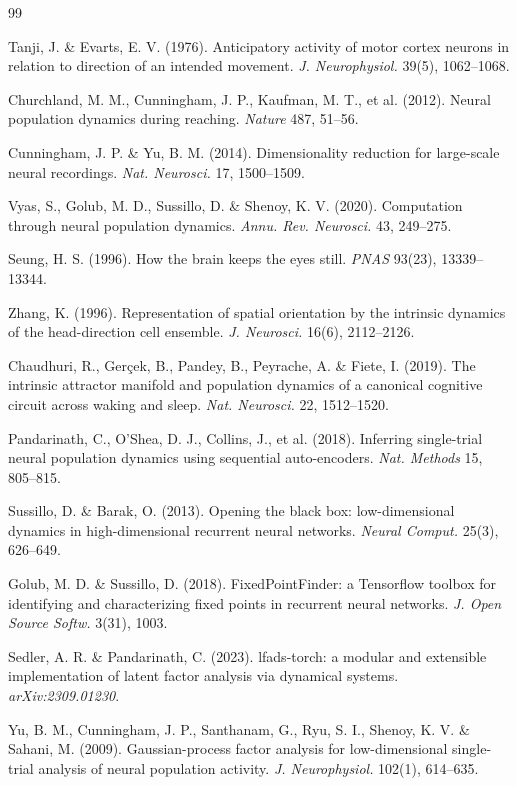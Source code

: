 \documentclass[11pt]{article}
\begin{document}
\begin{thebibliography}{99}

 Tanji, J. \& Evarts, E. V. (1976). Anticipatory activity of
motor cortex neurons in relation to direction of an intended movement.
\emph{J. Neurophysiol.} 39(5), 1062--1068.

 Churchland, M. M., Cunningham, J. P., Kaufman, M. T., et
al. (2012). Neural population dynamics during reaching. \emph{Nature} 487,
51--56.

 Cunningham, J. P. \& Yu, B. M. (2014). Dimensionality
reduction for large-scale neural recordings. \emph{Nat. Neurosci.} 17,
1500--1509.

 Vyas, S., Golub, M. D., Sussillo, D. \& Shenoy, K. V. (2020).
Computation through neural population dynamics. \emph{Annu. Rev. Neurosci.} 43,
249--275.

 Seung, H. S. (1996). How the brain keeps the eyes still.
\emph{PNAS} 93(23), 13339--13344.

 Zhang, K. (1996). Representation of spatial orientation by
the intrinsic dynamics of the head-direction cell ensemble.
\emph{J. Neurosci.} 16(6), 2112--2126.

 Chaudhuri, R., Ger\c{c}ek, B., Pandey, B., Peyrache, A.
\& Fiete, I. (2019). The intrinsic attractor manifold and population dynamics of
a canonical cognitive circuit across waking and sleep. \emph{Nat. Neurosci.} 22,
1512--1520.

 Pandarinath, C., O'Shea, D. J., Collins, J., et al.
(2018). Inferring single-trial neural population dynamics using sequential
auto-encoders. \emph{Nat. Methods} 15, 805--815.

 Sussillo, D. \& Barak, O. (2013). Opening the black box:
low-dimensional dynamics in high-dimensional recurrent neural networks.
\emph{Neural Comput.} 25(3), 626--649.

 Golub, M. D. \& Sussillo, D. (2018). FixedPointFinder: a
Tensorflow toolbox for identifying and characterizing fixed points in recurrent
neural networks. \emph{J. Open Source Softw.} 3(31), 1003.

 Sedler, A. R. \& Pandarinath, C. (2023). lfads-torch: a
modular and extensible implementation of latent factor analysis via dynamical
systems. \emph{arXiv:2309.01230}.

 Yu, B. M., Cunningham, J. P., Santhanam, G., Ryu, S. I., Shenoy,
K. V. \& Sahani, M. (2009). Gaussian-process factor analysis for low-dimensional
single-trial analysis of neural population activity. \emph{J. Neurophysiol.}
102(1), 614--635.


\end{thebibliography}
\end{document}
